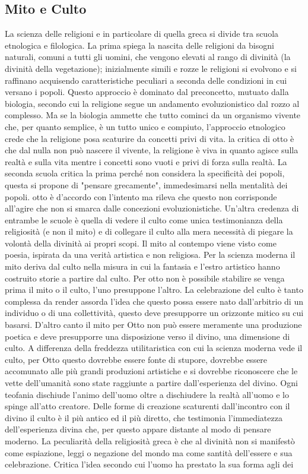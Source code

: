 \documentclass[10pt,a4paper]{article}
\begin{document}
\subsection{Mito e Culto}
La scienza delle religioni e in particolare di quella greca si divide tra scuola etnologica e filologica. La prima spiega la nascita delle religioni da bisogni naturali, comuni a tutti gli uomini, che vengono elevati al rango di divinità (la divinità della vegetazione); inizialmente simili e rozze le religioni si evolvono e si raffinano acquisendo caratteristiche peculiari a seconda delle condizioni in cui versano i popoli. Questo approccio è dominato dal preconcetto, mutuato dalla biologia, secondo cui la religione segue un andamento evoluzionistico dal rozzo al complesso. Ma se la biologia ammette che tutto cominci da un organismo vivente che, per quanto semplice, è un tutto unico e compiuto, l'approccio etnologico crede che la religione posa scaturire da concetti privi di vita. la critica di otto è che dal nulla non può nascere il vivente, la religione è viva in quanto agisce sulla realtà e sulla vita mentre i concetti sono vuoti e privi di forza sulla realtà. La seconda scuola critica la prima perché non considera la specificità dei popoli, questa si propone di "pensare grecamente", immedesimarsi nella mentalità dei popoli. otto è d'accordo con l'intento ma rileva che questo non corrisponde all'agire che non si smarca dalle concezioni evoluzionistiche. Un'altra credenza di entrambe le scuole è quella di vedere il culto come unica testimonianza della religiosità (e non il mito) e di collegare il culto alla mera necessità di piegare la volontà della divinità ai propri scopi. Il mito al contempo viene visto come poesia, ispirata da una verità artistica e non religiosa. Per la scienza moderna il mito deriva dal culto nella misura in cui la fantasia e l'estro artistico hanno costruito storie a partire dal culto. Per otto non è possibile stabilire se venga prima il mito o il culto, l'uno presuppone l'altro. La celebrazione del culto è tanto complessa da render assorda l'idea che questo possa essere nato dall'arbitrio di un individuo o di una collettività, questo deve presupporre un orizzonte mitico su cui basarsi. D'altro canto il mito per Otto non può essere meramente una produzione poetica e deve presupporre una disposizione verso il divino, una dimensione di culto. A differenza della freddezza utilitaristica con cui la scienza moderna vede il culto, per Otto questo dovrebbe essere fonte di stupore, dovrebbe essere accomunato alle più grandi produzioni artistiche e si dovrebbe riconoscere che le vette dell'umanità sono state raggiunte a partire dall'esperienza del divino. Ogni teofania dischiude l'animo dell'uomo oltre a dischiudere la realtà all'uomo e lo spinge all'atto creatore. Delle forme di creazione scaturenti dall'incontro con il divino il culto è il più antico ed il più diretto, che testimonia l'immediatezza dell'esperienza divina che, per questo appare distante al modo di pensare moderno. La peculiarità della religiosità greca è che al divinità non si manifestò come espiazione, leggi o negazione del mondo ma come santità dell'essere e sua celebrazione. Critica l'idea secondo cui l'uomo ha prestato la sua forma agli dei 
\end{document}
